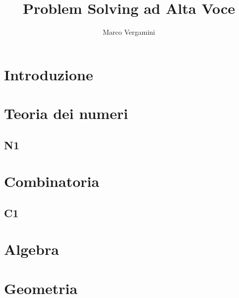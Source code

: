\documentclass{article}
\title{Problem Solving ad Alta Voce}
\date{}
\author{Marco Vergamini}
\begin{document}
\maketitle
\newpage
\tableofcontents
\newpage


\section{Introduzione}


\newpage

\section{Teoria dei numeri}

\subsection{N1}


\newpage

\section{Combinatoria}

\subsection{C1}


\newpage

\section{Algebra}

\newpage

\section{Geometria}
\end{document}
